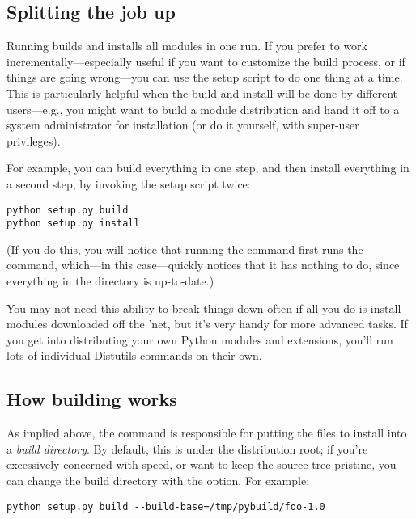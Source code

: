 \documentclass{howto}
\begin{document}
\subsection{Splitting the job up}
\label{splitting-up}

Running  builds and installs all modules in one
run.  If you prefer to work incrementally---especially useful if you
want to customize the build process, or if things are going wrong---you
can use the setup script to do one thing at a time.  This is
particularly helpful when the build and install will be done by
different users---e.g., you might want to build a module distribution
and hand it off to a system administrator for installation (or do it
yourself, with super-user privileges).

For example, you can build everything in one step, and then install
everything in a second step, by invoking the setup script twice:

\begin{verbatim}
python setup.py build
python setup.py install
\end{verbatim}

(If you do this, you will notice that running the 
command first runs the  command, which---in this
case---quickly notices that it has nothing to do, since everything in
the  directory is up-to-date.)

You may not need this ability to break things down often if all you do
is install modules downloaded off the 'net, but it's very handy for more
advanced tasks.  If you get into distributing your own Python modules
and extensions, you'll run lots of individual Distutils commands on
their own.


\subsection{How building works}
\label{how-build-works}

As implied above, the  command is responsible for putting
the files to install into a \emph{build directory}.  By default, this is
 under the distribution root; if you're excessively
concerned with speed, or want to keep the source tree pristine, you can
change the build directory with the  option.
For example:

\begin{verbatim}
python setup.py build --build-base=/tmp/pybuild/foo-1.0
\end{verbatim}
\end{document}
